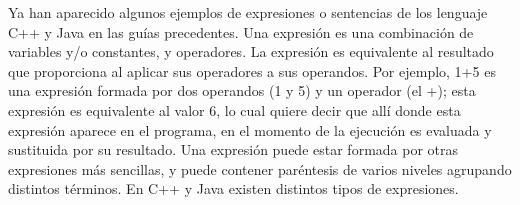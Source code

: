 Ya han aparecido algunos ejemplos de expresiones o sentencias de los lenguaje C++ y Java en las guías
precedentes. Una expresión es una combinación de variables y/o constantes, y operadores. La
expresión es equivalente al resultado que proporciona al aplicar sus operadores a sus
operandos. Por ejemplo, 1+5 es una expresión formada por dos operandos (1 y 5) y un
operador (el +); esta expresión es equivalente al valor 6, lo cual quiere decir que allí donde
esta expresión aparece en el programa, en el momento de la ejecución es evaluada y sustituida
por su resultado. Una expresión puede estar formada por otras expresiones más sencillas, y
puede contener paréntesis de varios niveles agrupando distintos términos. En C++ y Java existen
distintos tipos de expresiones.